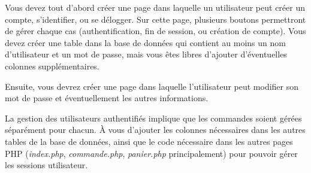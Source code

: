 

\vspace*{0.7cm}

\noindent {}

\bigskip

\noindent Vous devez tout d'abord créer une page  dans laquelle un utilisateur peut créer un compte, s'identifier, ou se délogger.
Sur cette page, plusieurs boutons permettront de gérer chaque cas (authentification, fin de session, ou création de compte).
Vous devez créer une table  dans la base de données qui contient au moins un nom d'utilisateur et un mot de passe, mais vous êtes libres d'ajouter d'éventuelles colonnes supplémentaires.

\medskip

\noindent Ensuite, vous devrez créer une page  dans laquelle l'utilisateur peut modifier son mot de passe et éventuellement les autres informations.

\medskip

\noindent La gestion des utilisateurs authentifiés implique que les commandes soient gérées séparément pour chacun.
À vous d'ajouter les colonnes nécessaires dans les autres tables de la base de données, ainsi que le code nécessaire dans les autres pages PHP (\textit{index.php}, \textit{commande.php}, \textit{panier.php} principalement) pour pouvoir gérer les sessions utilisateur.
